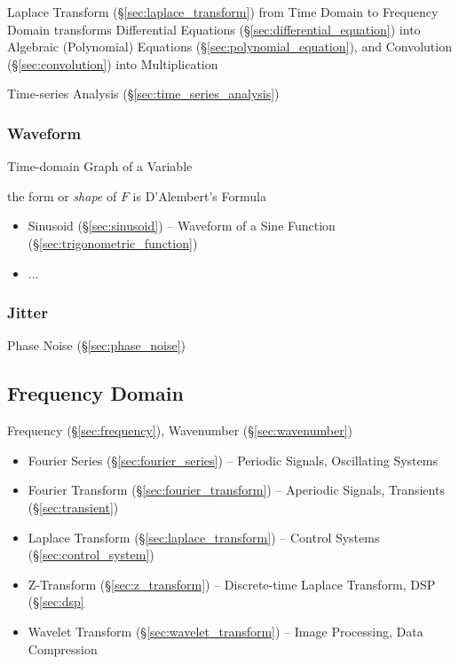 Laplace Transform (\S\ref{sec:laplace_transform}) from Time Domain to Frequency
Domain transforms Differential Equations (\S\ref{sec:differential_equation})
into Algebraic (Polynomial) Equations (\S\ref{sec:polynomial_equation}), and
Convolution (\S\ref{sec:convolution}) into Multiplication

\fist Time-series Analysis (\S\ref{sec:time_series_analysis})



\subsubsection{Waveform}\label{sec:waveform}

Time-domain Graph of a Variable

the form or \emph{shape} of $F$ is D'Alembert's Formula

\begin{itemize}
  \item Sinusoid (\S\ref{sec:sinusoid}) -- Waveform of a Sine Function
    (\S\ref{sec:trigonometric_function})
  \item ...
\end{itemize}



\subsubsection{Jitter}\label{sec:jitter}

Phase Noise (\S\ref{sec:phase_noise})



\subsection{Frequency Domain}\label{sec:frequency_domain}

Frequency (\S\ref{sec:frequency}), Wavenumber (\S\ref{sec:wavenumber})

\begin{itemize}
  \item Fourier Series (\S\ref{sec:fourier_series}) -- Periodic Signals,
    Oscillating Systems
  \item Fourier Transform (\S\ref{sec:fourier_transform}) -- Aperiodic Signals,
    Transients (\S\ref{sec:transient})
  \item Laplace Transform (\S\ref{sec:laplace_transform}) -- Control Systems
    (\S\ref{sec:control_system})
  \item Z-Transform (\S\ref{sec:z_transform}) -- Discrete-time Laplace
    Transform, DSP (\S\ref{sec:dsp}
  \item Wavelet Transform (\S\ref{sec:wavelet_transform}) -- Image Processing,
    Data Compression
\end{itemize}

